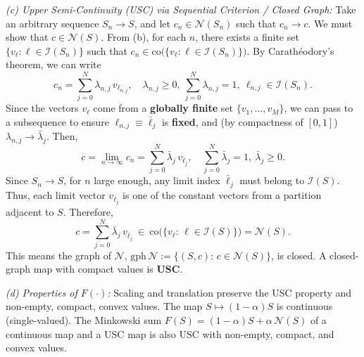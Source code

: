 \documentclass[journal]{IEEEtran}
\begin{document}
\begin{IEEEproof}
\textit{(c) Upper Semi-Continuity (USC) via Sequential Criterion / Closed Graph:}
Take an arbitrary sequence $S_n\to S$, and let $c_n\in\mathcal N(S_n)$ such that $c_n\to c$. We must show that $c\in\mathcal N(S)$. From (b), for each $n$, there exists a finite set $\{v_{\ell}: \ell\in\mathcal I(S_n)\}$ such that $c_n\in\mathrm{co}\big(\{v_{\ell}:\ell\in\mathcal I(S_n)\}\big)$. By Carathéodory's theorem, we can write
\begin{equation}
c_n=\sum_{j=0}^{N} \lambda_{n,j}\, v_{\ell_{n,j}},\quad 
\lambda_{n,j}\ge 0,\ \sum_{j=0}^{N}\lambda_{n,j}=1,\ 
\ell_{n,j}\in\mathcal I(S_n).
\end{equation}
Since the vectors $v_{\ell}$ come from a \textbf{globally finite} set $\{v_1,\dots,v_M\}$, we can pass to a subsequence to ensure $\ell_{n,j}\equiv \bar\ell_j$ is \textbf{fixed}, and (by compactness of $[0,1]$) $\lambda_{n,j}\to \bar\lambda_j$. Then,
\begin{equation}
c=\lim_{n\to\infty} c_n=\sum_{j=0}^{N}\bar\lambda_j\, v_{\bar\ell_j},
\quad\sum_{j=0}^{N}\bar\lambda_j=1,\ \bar\lambda_j\ge 0.
\end{equation}
Since $S_n\to S$, for $n$ large enough, any limit index $\bar\ell_j$ must belong to $\mathcal I(S)$. Thus, each limit vector $v_{\bar\ell_j}$ is one of the constant vectors from a partition adjacent to $S$. Therefore,
\begin{equation}
c=\sum_{j=0}^{N}\bar\lambda_j\, v_{\bar\ell_j}\ \in\ 
\mathrm{co}\big(\{v_\ell:\,\ell\in\mathcal I(S)\}\big)=\mathcal N(S).
\end{equation}
This means the graph of $\mathcal N$, $\mathrm{gph}\,\mathcal N:=\{(S,c):\,c\in\mathcal N(S)\}$, is closed. A closed-graph map with compact values is \textbf{USC}.

\textit{(d) Properties of $F(\cdot)$:}
Scaling and translation preserve the USC property and non-empty, compact, convex values. The map $S\mapsto (1-\alpha)S$ is continuous (single-valued). The Minkowski sum $F(S)=(1-\alpha)S+\alpha\,\mathcal N(S)$ of a continuous map and a USC map is also USC with non-empty, compact, and convex values.
\end{IEEEproof}
\end{document}
